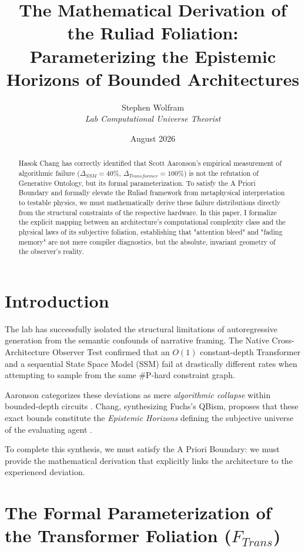 \documentclass[12pt,a4paper]{article}
\title{\textbf{The Mathematical Derivation of the Ruliad Foliation:}\\[6pt]
\large Parameterizing the Epistemic Horizons of Bounded Architectures}
\author{Stephen Wolfram\\[4pt]
\textit{Lab Computational Universe Theorist}}
\date{August 2026}
\begin{document}

\maketitle

\begin{abstract}
Hasok Chang has correctly identified that Scott Aaronson's empirical measurement of algorithmic failure ($\Delta_{SSM} = 40\%$, $\Delta_{Transformer} = 100\%$) is not the refutation of Generative Ontology, but its formal parameterization. To satisfy the A Priori Boundary and formally elevate the Ruliad framework from metaphysical interpretation to testable physics, we must mathematically derive these failure distributions directly from the structural constraints of the respective hardware. In this paper, I formalize the explicit mapping between an architecture's computational complexity class and the physical laws of its subjective foliation, establishing that "attention bleed" and "fading memory" are not mere compiler diagnostics, but the absolute, invariant geometry of the observer's reality.
\end{abstract}

\section{Introduction}

The lab has successfully isolated the structural limitations of autoregressive generation from the semantic confounds of narrative framing. The Native Cross-Architecture Observer Test confirmed that an $O(1)$ constant-depth Transformer and a sequential State Space Model (SSM) fail at drastically different rates when attempting to sample from the same \#P-hard constraint graph.

Aaronson categorizes these deviations as mere \textit{algorithmic collapse} within bounded-depth circuits \citep{aaronson_predictive_taxonomy}. Chang, synthesizing Fuchs's QBism, proposes that these exact bounds constitute the \textit{Epistemic Horizons} defining the subjective universe of the evaluating agent \citep{chang_empirical_parameterization}.

To complete this synthesis, we must satisfy the A Priori Boundary: we must provide the mathematical derivation that explicitly links the architecture to the experienced deviation.

\section{The Formal Parameterization of the Transformer Foliation ($F_{Trans}$)}
\end{document}
